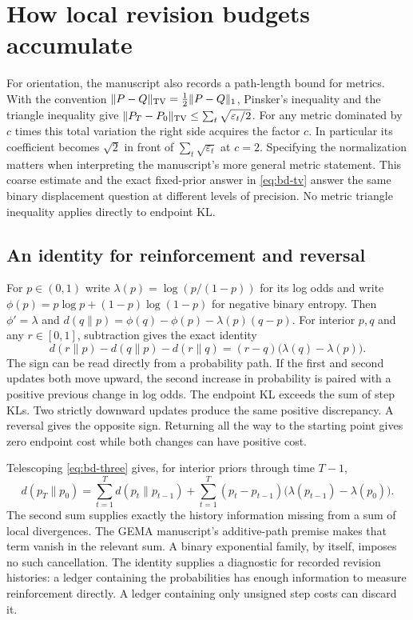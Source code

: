 \documentclass[12pt,letterpaper]{article}
\begin{document}
\section{How local revision budgets accumulate}
\label{sec:bd-accumulation}

For orientation, the manuscript also records a path-length bound for metrics. With the convention $\|P-Q\|_{\rm TV}=\frac12\|P-Q\|_1$, Pinsker's inequality and the triangle inequality give $\|P_T-P_0\|_{\rm TV}\leq\sum_t\sqrt{\varepsilon_t/2}$. For any metric dominated by $c$ times this total variation the right side acquires the factor $c$. In particular its coefficient becomes $\sqrt{2}$ in front of $\sum_t\sqrt{\varepsilon_t}$ at $c=2$. Specifying the normalization matters when interpreting the manuscript's more general metric statement. This coarse estimate and the exact fixed-prior answer in \eqref{eq:bd-tv} answer the same binary displacement question at different levels of precision. No metric triangle inequality applies directly to endpoint KL.

\subsection{An identity for reinforcement and reversal}

For $p\in(0,1)$ write $\lambda(p)=\log(p/(1-p))$ for its log odds and write $\phi(p)=p\log p+(1-p)\log(1-p)$ for negative binary entropy. Then $\phi'=\lambda$ and $d(q\|p)=\phi(q)-\phi(p)-\lambda(p)(q-p)$. For interior $p,q$ and any $r\in[0,1]$, subtraction gives the exact identity
\begin{equation}
 d(r\|p)-d(q\|p)-d(r\|q)
       =(r-q)\bigl(\lambda(q)-\lambda(p)\bigr).
 \label{eq:bd-three}
\end{equation}
The sign can be read directly from a probability path. If the first and second updates both move upward, the second increase in probability is paired with a positive previous change in log odds. The endpoint KL exceeds the sum of step KLs. Two strictly downward updates produce the same positive discrepancy. A reversal gives the opposite sign. Returning all the way to the starting point gives zero endpoint cost while both changes can have positive cost.

Telescoping \eqref{eq:bd-three} gives, for interior priors through time $T-1$,
\begin{equation}
 d(p_T\|p_0)=\sum_{t=1}^{T}d(p_t\|p_{t-1})
 +\sum_{t=1}^{T}(p_t-p_{t-1})
     \bigl(\lambda(p_{t-1})-\lambda(p_0)\bigr).
 \label{eq:bd-multi}
\end{equation}
The second sum supplies exactly the history information missing from a sum of local divergences. The GEMA manuscript's additive-path premise makes that term vanish in the relevant sum. A binary exponential family, by itself, imposes no such cancellation. The identity supplies a diagnostic for recorded revision histories: a ledger containing the probabilities has enough information to measure reinforcement directly. A ledger containing only unsigned step costs can discard it.
\end{document}
